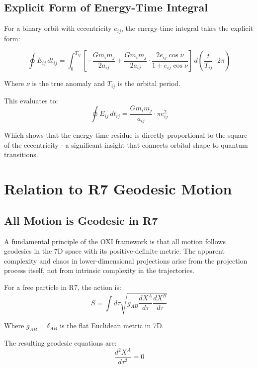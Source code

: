 \documentclass{article}
\begin{document}
\subsection{Explicit Form of Energy-Time Integral}

For a binary orbit with eccentricity $e_{ij}$, the energy-time integral takes the explicit form:

\begin{equation}
\oint E_{ij} \, dt_{ij} = \int_0^{T_{ij}} \left[-\frac{G m_i m_j}{2a_{ij}} + \frac{G m_i m_j}{2a_{ij}} \cdot \frac{2e_{ij}\cos\nu}{1+e_{ij}\cos\nu}\right] \, d\left(\frac{t}{T_{ij}} \cdot 2\pi\right)
\end{equation}

Where $\nu$ is the true anomaly and $T_{ij}$ is the orbital period.

This evaluates to:
\begin{equation}
\oint E_{ij} \, dt_{ij} = \frac{G m_i m_j}{a_{ij}} \cdot \pi e_{ij}^2
\end{equation}

Which shows that the energy-time residue is directly proportional to the square of the eccentricity - a significant insight that connects orbital shape to quantum transitions.

\section{Relation to R7 Geodesic Motion}

\subsection{All Motion is Geodesic in R7}

A fundamental principle of the OXI framework is that all motion follows geodesics in the 7D space with its positive-definite metric. The apparent complexity and chaos in lower-dimensional projections arise from the projection process itself, not from intrinsic complexity in the trajectories.

For a free particle in R7, the action is:
\begin{equation}
S = \int d\tau \sqrt{g_{AB} \frac{dX^A}{d\tau} \frac{dX^B}{d\tau}}
\end{equation}

Where $g_{AB} = \delta_{AB}$ is the flat Euclidean metric in 7D.

The resulting geodesic equations are:
\begin{equation}
\frac{d^2 X^A}{d\tau^2} = 0
\end{equation}
\end{document}
